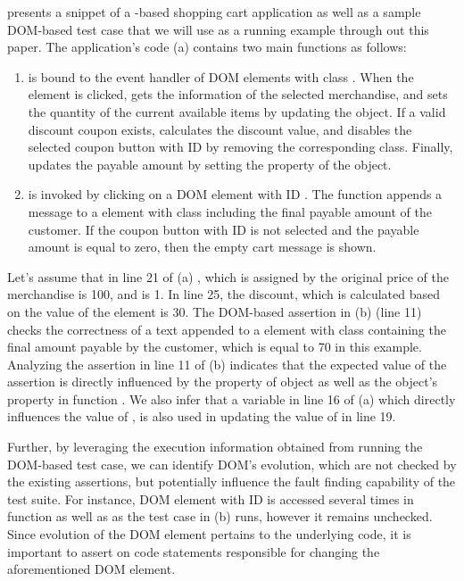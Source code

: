  presents a snippet of a \javascript-based shopping cart application as well as a sample DOM-based \selenium test case that we will use as a running example through out this paper. The application's code (a) contains two main functions as follows:
\begin{enumerate}
\item {} is bound to the event handler of DOM elements with class . When the element is clicked,  gets the information of the selected merchandise, and sets the quantity of the current available items by updating the  object. If a valid discount coupon exists,  calculates the discount value, and disables the selected  coupon button with ID  by removing the corresponding class. Finally,  updates the payable amount by setting the  property of the  object.
\item {} is invoked by clicking on a DOM element with ID . The function appends a message to a  element with class  including the final payable amount of the customer. If the  coupon button with ID  is not selected and the payable amount is equal to zero, then the empty cart message is shown.    
\end{enumerate}
Let's assume that in line 21 of (a) , which is assigned by the original price of the merchandise is 100, and  is 1. In line 25, the discount, which is calculated based on the  value of the  element is 30. 
The DOM-based assertion in (b) (line 11) checks the correctness of a text appended to a  element with class  containing the final amount payable by the customer, which is equal to 70 in this example.
Analyzing the assertion in line 11 of (b) indicates that the expected value of the assertion is directly influenced by the  property of  object as well as the object's property  in function . We also infer that a variable in line 16 of (a) which directly influences the value of , is also used in updating the value of  in line 19.

Further, by leveraging the execution information obtained from running the DOM-based test case, we can identify DOM's evolution, which are not checked by the existing assertions, but potentially influence the fault finding capability of the test suite. For instance, DOM element with ID  is accessed several times in function  as well as  as the test case in (b) runs, however it remains unchecked. Since evolution of the  DOM element pertains to the underlying \javascript code, it is important to assert on code statements responsible for changing the aforementioned DOM element.             

